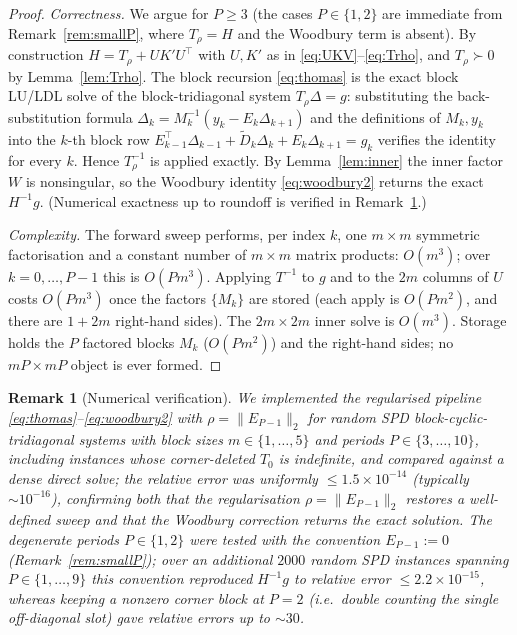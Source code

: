 \documentclass{amsart}
\newtheorem{remark}{Remark}
\begin{document}
\begin{proof}
\emph{Correctness.} We argue for $P\ge3$ (the cases $P\in\{1,2\}$ are immediate from
Remark~\ref{rem:smallP}, where $T_\rho=H$ and the Woodbury term is absent). By
construction $H=T_\rho+UK'U^{\!\top}$ with $U,K'$ as in
\eqref{eq:UKV}--\eqref{eq:Trho}, and $T_\rho\succ0$ by Lemma~\ref{lem:Trho}. The block
recursion \eqref{eq:thomas} is the exact block LU/LDL solve of the block-tridiagonal
system $T_\rho\Delta=g$: substituting the back-substitution formula
$\Delta_k=M_k^{-1}(y_k-E_k\Delta_{k+1})$ and the definitions of $M_k,y_k$ into the
$k$-th block row
$E_{k-1}^{\!\top}\Delta_{k-1}+\widetilde D_k\Delta_k+E_k\Delta_{k+1}=g_k$ verifies the
identity for every $k$. Hence $T_\rho^{-1}$ is applied exactly. By
Lemma~\ref{lem:inner} the inner factor $W$ is nonsingular, so the Woodbury identity
\eqref{eq:woodbury2} returns the exact $H^{-1}g$. (Numerical exactness up to roundoff
is verified in Remark~\ref{rem:num}.)

\emph{Complexity.} The forward sweep performs, per index $k$, one $m\times m$
symmetric factorisation and a constant number of $m\times m$ matrix products:
$O(m^3)$; over $k=0,\dots,P-1$ this is $O(Pm^3)$. Applying $T^{-1}$ to $g$ and to the
$2m$ columns of $U$ costs $O(Pm^3)$ once the factors $\{M_k\}$ are stored (each apply
is $O(Pm^2)$, and there are $1+2m$ right-hand sides). The $2m\times2m$ inner solve is
$O(m^3)$. Storage holds the $P$ factored blocks $M_k$ ($O(Pm^2)$) and the
right-hand sides; no $mP\times mP$ object is ever formed.
\end{proof}

\begin{remark}[Numerical verification]\label{rem:num}
We implemented the regularised pipeline \eqref{eq:thomas}--\eqref{eq:woodbury2} with
$\rho=\|E_{P-1}\|_2$ for random SPD block-cyclic-tridiagonal systems with block
sizes $m\in\{1,\dots,5\}$ and periods $P\in\{3,\dots,10\}$, including instances whose
corner-deleted $T_0$ is \emph{indefinite}, and compared against a dense direct solve;
the relative error was uniformly $\le1.5\times10^{-14}$ (typically
$\sim10^{-16}$), confirming both that the regularisation $\rho=\|E_{P-1}\|_2$ restores
a well-defined sweep and that the Woodbury correction returns the exact solution.
The degenerate periods $P\in\{1,2\}$ were tested with the convention $E_{P-1}:=0$
(Remark~\ref{rem:smallP}); over an additional $2000$ random SPD instances spanning
$P\in\{1,\dots,9\}$ this convention reproduced $H^{-1}g$ to relative error
$\le2.2\times10^{-15}$, whereas keeping a nonzero corner block at $P=2$ (i.e.\ double
counting the single off-diagonal slot) gave relative errors up to $\sim30$.
\end{remark}
\end{document}
